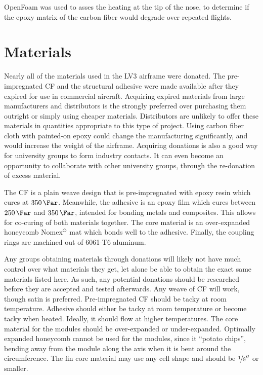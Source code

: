 \documentclass{aiaa-tc}%
\newcommand{\mathregistered}{\text{\textregistered}}
\begin{document}
OpenFoam was used to asses the heating at the tip of the nose, to determine if the epoxy matrix of the carbon fiber would degrade over repeated flights.


\section{Materials}
Nearly all of the materials used in the LV3 airframe were donated. The pre-impregnated CF and the structural adhesive were made available after they expired for use in commercial aircraft. 
Acquiring expired materials from large manufacturers and distributors is the strongly preferred over purchasing them outright or simply using cheaper materials. 
Distributors are unlikely to offer these materials in quantities appropriate to this type of project. 
Using carbon fiber cloth with painted-on epoxy could change the manufacturing significantly, and would increase the weight of the airframe. 
Acquiring donations is also a good way for university groups to form industry contacts. It can even become an opportunity to collaborate with other university groups, through the re-donation of excess material. 

The CF is a plain weave design that is pre-impregnated with epoxy resin which cures at $\SI{350}{\Far}$.
Meanwhile, the adhesive is an epoxy film which cures between $\SI{250}{\Far}$ and $\SI{350}{\Far}$, intended for bonding metals and composites. 
This allows for co-curing of both materials together. The core material is an over-expanded honeycomb Nomex$^\mathregistered$ mat which bonds well to the adhesive.
Finally, the coupling rings are machined out of 6061-T6 aluminum. 

Any groups obtaining materials through donations will likely not have much control over what materials they get, let alone be able to obtain the exact same materials listed here.
As such, any potential donations should be researched before they are accepted and tested afterwards. 
Any weave of CF will work, though satin is preferred. Pre-impregnated CF should be tacky at room temperature.
Adhesive should either be tacky at room temperature or become tacky when heated. Ideally, it should flow at higher temperatures. 
The core material for the modules should be over-expanded or under-expanded. 
Optimally expanded honeycomb cannot be used for the modules, since it ``potato chips'', bending away from the module along the axis when it is bent around the circumference. 
The fin core material may use any cell shape and should be $\nicefrac{1}{8}''$ or smaller. 
\end{document}
